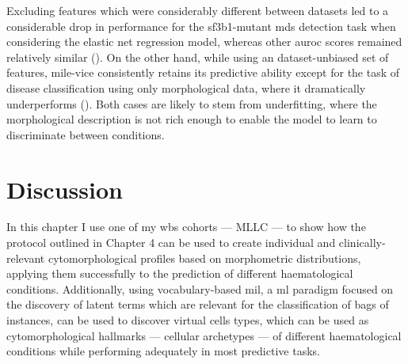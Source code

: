 Excluding features which were considerably different between datasets led to a considerable drop in performance for the \ac{sf3b1}-mutant \ac{mds} detection task when considering the elastic net regression model, whereas other \ac{auroc} scores remained relatively similar (). On the other hand, while using an dataset-unbiased set of features, \ac{mile-vice} consistently retains its predictive ability except for the task of disease classification using only morphological data, where it dramatically underperforms (). Both cases are likely to stem from underfitting, where the morphological description is not rich enough to enable the model to learn to discriminate between conditions.

\begin{figure}[!ht]
    \label{fig:glmnet-auc-validation-unbiased}
\end{figure}

\begin{figure}[!ht]
    \label{fig:mile-vice-auc-validation-unbiased}
\end{figure}

\FloatBarrier

\section{Discussion}

In this chapter I use one of my \ac{wbs} cohorts --- MLLC --- to show how the protocol outlined in Chapter 4 can be used to create individual and clinically-relevant cytomorphological profiles based on morphometric distributions, applying them successfully to the prediction of different haematological conditions. Additionally, using vocabulary-based \ac{mil}, a \ac{ml} paradigm focused on the discovery of latent terms which are relevant for the classification of bags of instances, can be used to discover virtual cells types, which can be used as cytomorphological hallmarks --- cellular archetypes --- of different haematological conditions while performing adequately in most predictive tasks.

